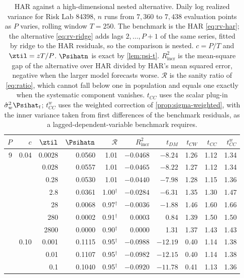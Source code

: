\begin{table}[htbp]
\centering
\caption{HAR against a high-dimensional nested alternative. Daily log realized variance for Risk Lab 84398, $n$ runs from $7,360$ to $7,438$ evaluation points as $P$ varies, rolling window $T=250$. The benchmark is the HAR \eqref{eq:rv-har}; the alternative \eqref{eq:rv-ridge} adds lags $2,\dots,P+1$ of the same series, fitted by ridge to the HAR residuals, so the comparison is nested. $c=P/T$ and $\ztil=zT/P$. $\Psihatn$ is exact by \cref{lem:psi-t}. $R^2_{\text{incr}}$ is the mean-square gap of the alternative over HAR divided by HAR's mean squared error, negative when the larger model forecasts worse. $\mathcal R$ is the sanity ratio of \eqref{eq:ratio}, which cannot fall below one in population and equals one exactly when the systematic component vanishes. $t_{CC}$ uses the scalar plug-in $\hat\sigma^2_w\Psihat_t$; $t_{CC}^{w}$ uses the weighted correction of \cref{prop:sigma-weighted}, with the inner variance taken from first differences of the benchmark residuals, as a lagged-dependent-variable benchmark requires.}
\label{tab:rv-main}
\small
\begin{tabular}{rrrrrrrrrr}
\toprule
$P$ & $c$ & $\ztil$ & $\Psihatn$ & $\mathcal R$ & $R^2_{\text{incr}}$ & $t_{DM}$ & $t_{CW}$ & $t_{CC}$ & $t_{CC}^{w}$ \\
\midrule
9 & 0.04 & 0.0028 & 0.0560 & 1.01 & $-0.0468$ & $-8.24$ & 1.26 & 1.12 & 1.34 \\
 &  & 0.028 & 0.0557 & 1.01 & $-0.0465$ & $-8.22$ & 1.27 & 1.12 & 1.34 \\
 &  & 0.28 & 0.0530 & 1.01 & $-0.0440$ & $-7.98$ & 1.28 & 1.15 & 1.36 \\
 &  & 2.8 & 0.0361 & 1.00$^{\dagger}$ & $-0.0284$ & $-6.31$ & 1.35 & 1.30 & 1.47 \\
 &  & 28 & 0.0068 & 0.97$^{\dagger}$ & $-0.0036$ & $-1.88$ & 1.46 & 1.60 & 1.66 \\
 &  & 280 & 0.0002 & 0.91$^{\dagger}$ & 0.0003 & 0.84 & 1.39 & 1.50 & 1.50 \\
 &  & 2800 & 0.0000 & 0.90$^{\dagger}$ & 0.0000 & 1.31 & 1.37 & 1.43 & 1.43 \\
\addlinespace
24 & 0.10 & 0.001 & 0.1115 & 0.95$^{\dagger}$ & $-0.0988$ & $-12.19$ & 0.40 & 1.14 & 1.38 \\
 &  & 0.01 & 0.1107 & 0.95$^{\dagger}$ & $-0.0982$ & $-12.15$ & 0.40 & 1.14 & 1.38 \\
 &  & 0.1 & 0.1040 & 0.95$^{\dagger}$ & $-0.0920$ & $-11.78$ & 0.41 & 1.13 & 1.36 \\

\end{tabular}
\end{table}
